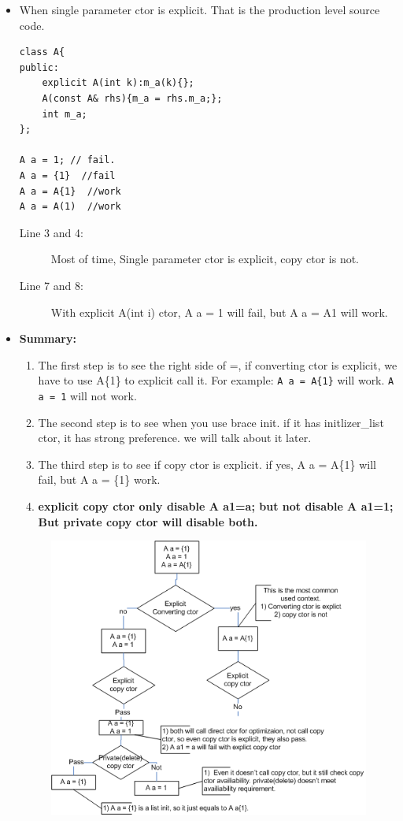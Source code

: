 \documentclass[a4paper,11pt,twoside]{book}
\begin{document}
\begin{itemize}
	\item  When single parameter ctor is explicit. That is the production level source code. 
\begin{lstlisting}
class A{
public:
	explicit A(int k):m_a(k){};
	A(const A& rhs){m_a = rhs.m_a;};
	int m_a;
};
	
A a = 1; // fail. 
A a = {1}  //fail
A a = A{1}  //work
A a = A(1)  //work
\end{lstlisting}
	\begin{description}
		\item[Line 3 and 4:] Most of time, Single parameter ctor is explicit, copy ctor is not.
		
		\item[Line 7 and 8:] With explicit A(int i) ctor, A a = 1 will fail, but A a = A{1} will work.
	\end{description}


\item \textbf{Summary:}
\begin{enumerate}
	\item The first step is to see the right side of =, if converting ctor is explicit, we have to use A\{1\} to explicit call it. For example: \texttt{A a = A\{1\}} will work. \texttt{A a = 1} will not work. 
	
	\item The second step is to see when you use brace init. if it has initlizer\_list ctor, it has strong preference. we will talk about it later.
	
	\item The third step is to see if copy ctor is explicit. if yes, A a = A\{1\} will fail, but A a = \{1\} work.
	
	\item \textbf{explicit copy ctor only disable A a1=a; but not disable A a1=1; But private copy ctor will disable both.}
	
\end{enumerate}

\begin{figure}[h]
	\centering
	\includegraphics[width=0.8\linewidth]{pics/copy_init.png}
	\caption{}
	\label{Explicit and init }
\end{figure}


\end{itemize}
\end{document}
